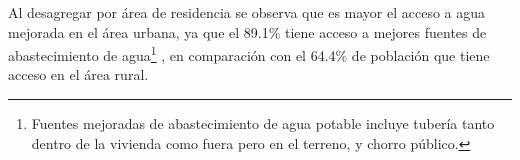 Al desagregar por área de residencia se observa que es mayor el acceso a agua mejorada en el área urbana, ya que el 89.1\% tiene acceso a mejores fuentes de abastecimiento de agua\footnote{Fuentes mejoradas de abastecimiento de agua potable incluye tubería tanto  dentro de la vivienda como  fuera pero en el terreno, y chorro público.} , en comparación con el 64.4\% de población que tiene acceso en el área rural.